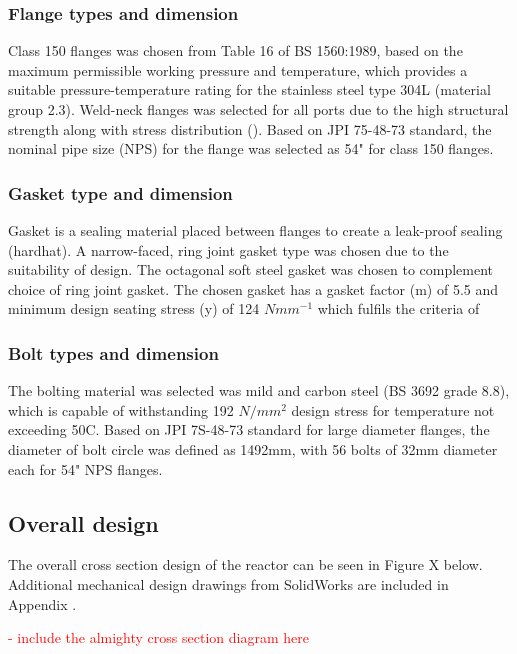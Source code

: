 

\subsubsection{Flange types and dimension}
Class 150 flanges was chosen from Table 16 of BS 1560:1989, based on the maximum permissible working pressure and temperature, which provides a suitable pressure-temperature rating for the stainless steel type 304L (material group 2.3). Weld-neck flanges was selected for all ports due to the high structural strength along with stress distribution ().
Based on JPI 75-48-73 standard, the nominal pipe size (NPS) for the flange was selected as 54" for class 150 flanges.
\subsubsection{Gasket type and dimension}
Gasket is a sealing material placed between flanges to create a leak-proof sealing (hardhat). A narrow-faced, ring joint gasket type was chosen due to the suitability of design. The octagonal soft steel gasket was chosen to complement choice of ring joint gasket. The chosen gasket has a gasket factor (m) of 5.5 and minimum design seating stress (y) of 124 $Nmm^{-1}$ which fulfils the criteria of

\subsubsection{Bolt types and dimension}
The bolting material was selected was mild and carbon steel (BS 3692 grade 8.8), which is capable of withstanding 192 $N/mm^2$ design stress for temperature not exceeding 50C. Based on JPI 7S-48-73 standard for large diameter flanges, the diameter of bolt circle was defined as 1492mm, with 56 bolts of 32mm diameter each for 54" NPS flanges. 

\subsection{Overall design}
The overall cross section design of the reactor can be seen in Figure X below. Additional mechanical design drawings from SolidWorks are included in Appendix .

\textcolor{red}{- include the almighty cross section diagram here}

